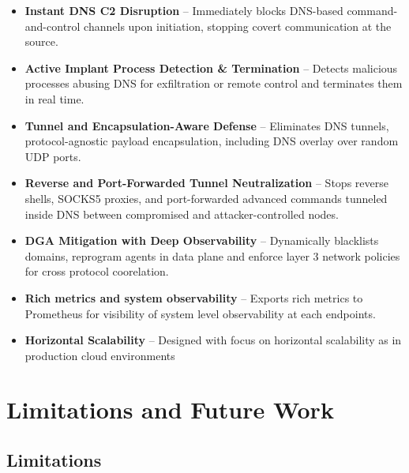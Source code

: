 \documentclass [11pt, proquest] {uwthesis}[2020/02/24]
\begin{document}
\vspace{-15pt}
\begin{itemize}[nosep]
    \item \textbf{Instant DNS C2 Disruption} – Immediately blocks DNS-based command-and-control channels upon initiation, stopping covert communication at the source.

    \item \textbf{Active Implant Process Detection \& Termination} – Detects malicious processes abusing DNS for exfiltration or remote control and terminates them in real time.

    \item \textbf{Tunnel and Encapsulation-Aware Defense} – Eliminates DNS tunnels, protocol-agnostic payload encapsulation, including DNS overlay over random UDP ports.

    \item \textbf{Reverse and Port-Forwarded Tunnel Neutralization} – Stops reverse shells, SOCKS5 proxies, and port-forwarded advanced commands tunneled inside DNS between compromised and attacker-controlled nodes.

    \item \textbf{DGA Mitigation with Deep Observability} – Dynamically blacklists  domains, reprogram agents in data plane and enforce layer 3 network policies for cross protocol coorelation.

    \item \textbf{Rich metrics and system observability} – Exports rich metrics to Prometheus for visibility of system level observability at each endpoints.

    \item \textbf{Horizontal Scalability} – Designed with focus on horizontal scalability as in production cloud environments 

\end{itemize}

\section{Limitations and Future Work}

\subsection*{Limitations}
\end{document}
